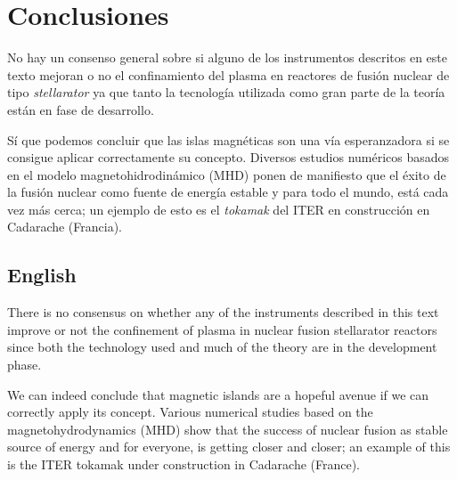 \chapter{Conclusiones}
No hay un consenso general sobre si alguno de los instrumentos descritos en este
texto mejoran o no el confinamiento del plasma en reactores de fusión nuclear de tipo
\textit{stellarator} ya que tanto la tecnología utilizada como 
gran parte de la teoría están en fase de desarrollo.\par
Sí que podemos concluir que las islas magnéticas son una vía esperanzadora si se
consigue aplicar correctamente su concepto. 
Diversos estudios numéricos basados en el modelo magnetohidrodinámico (MHD)
ponen de manifiesto que el éxito de la fusión nuclear como fuente de energía
estable y para todo el mundo, está cada vez más cerca; un ejemplo de esto 
es el \textit{tokamak} del ITER en construcción en Cadarache (Francia).
\section*{English}
There is no consensus on whether any of the instruments described in this text
improve or not the confinement of plasma in nuclear fusion stellarator reactors
since both the technology used and much of the theory are in the development phase.\par
We can indeed conclude that magnetic islands are a hopeful avenue if we can 
correctly apply its concept. Various numerical studies based on the 
magnetohydrodynamics (MHD) show that the success of nuclear fusion as
stable source of energy and for everyone, is getting closer and closer; an example of this
is the ITER tokamak under construction in Cadarache (France).